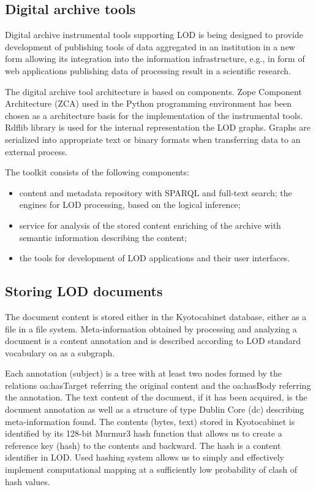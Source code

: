 \documentclass[12pt]{llncs}
\begin{document}
\subsection{Digital archive tools}

Digital archive instrumental tools supporting LOD is being designed to
provide development of publishing tools of data aggregated in an
institution in a new form allowing its integration into the information
infrastructure, e.g., in form of web applications publishing data of
processing result in a scientific research.

The digital archive tool architecture is based on components. Zope
Component Architecture (ZCA) \cite{b6} used in the Python programming
environment \cite{b7} has been chosen as a architecture basis for the
implementation of the instrumental tools. Rdflib library is used for the
internal representation the LOD graphs. Graphs are serialized into
appropriate text or binary formats when transferring data to an external
process.

The toolkit consists of the following components:

\begin{itemize}
\item
  content and metadata repository with SPARQL and full-text search; the
  engines for LOD processing, based on the logical inference;
\item
  service for analysis of the stored content enriching of the archive
  with semantic information describing the content;
\item
  the tools for development of LOD applications and their user
  interfaces.
\end{itemize}



\subsection{Storing LOD documents}

The document content is stored either in the Kyotocabinet database,
either as a file in a file system. Meta-information obtained by
processing and analyzing a document is a content annotation and is
described according to LOD standard vocabulary oa as a subgraph.

Each annotation (subject) is a tree with at least two nodes formed by
the relations oa:hasTarget referring the original content and the
oa:hasBody referring the annotation. The text content of the document,
if it has been acquired, is the document annotation as well as a
structure of type Dublin Core (dc) describing meta-information found.
The contents (bytes, text) stored in Kyotocabinet is identified by its
128-bit Murmur3 hash function that allows us to create a reference key
(hash) to the contents and backward. The hash is a content identifier in
LOD. Used hashing system allows us to simply and effectively implement
computational mapping at a sufficiently low probability of clash of hash
values.
\end{document}
